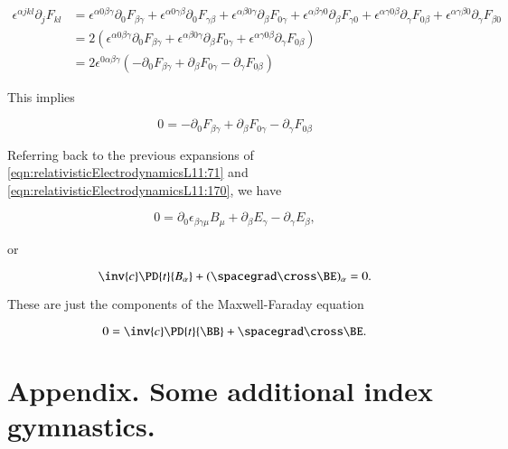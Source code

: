\begin{align*}
\epsilon^{\alpha j k l} \partial_j F_{k l}
&=
\epsilon^{\alpha 0 \beta \gamma} \partial_0 F_{\beta \gamma}
+\epsilon^{\alpha 0 \gamma \beta} \partial_0 F_{\gamma \beta}
+\epsilon^{\alpha \beta 0 \gamma} \partial_\beta F_{0 \gamma}
+\epsilon^{\alpha \beta \gamma 0} \partial_\beta F_{\gamma 0}
+\epsilon^{\alpha \gamma 0 \beta} \partial_\gamma F_{0 \beta}
+\epsilon^{\alpha \gamma \beta 0} \partial_\gamma F_{\beta 0} \\
&=
2 \left( 
\epsilon^{\alpha 0 \beta \gamma} \partial_0 F_{\beta \gamma}
+\epsilon^{\alpha \beta 0 \gamma} \partial_\beta F_{0 \gamma}
+\epsilon^{\alpha \gamma 0 \beta} \partial_\gamma F_{0 \beta}
\right) \\
&=
2 \epsilon^{0 \alpha \beta \gamma} \left(
-\partial_0 F_{\beta \gamma}
+\partial_\beta F_{0 \gamma}
- \partial_\gamma F_{0 \beta}
\right)
\end{align*}

This implies

\begin{equation}\label{eqn:relativisticElectrodynamicsL11:1320}
0 =
-\partial_0 F_{\beta \gamma}
+\partial_\beta F_{0 \gamma}
- \partial_\gamma F_{0 \beta}
\end{equation}

Referring back to the previous expansions of \ref{eqn:relativisticElectrodynamicsL11:71} and \ref{eqn:relativisticElectrodynamicsL11:170}, we have

\begin{equation}\label{eqn:relativisticElectrodynamicsL11:1340}
0 =
\partial_0 \epsilon_{\beta\gamma\mu} B_\mu
+\partial_\beta E_\gamma
- \partial_\gamma E_{\beta},
\end{equation}

or

\begin{equation}\label{eqn:relativisticElectrodynamicsL11:1360}
\inv{c} \PD{t}{B_\alpha} + (\spacegrad \cross \BE)_\alpha = 0.
\end{equation}

These are just the components of the Maxwell-Faraday equation

\begin{equation}\label{eqn:relativisticElectrodynamicsL11:930}
0 = \inv{c} \PD{t}{\BB} + \spacegrad \cross \BE.
\end{equation}

\section{Appendix. Some additional index gymnastics.}


